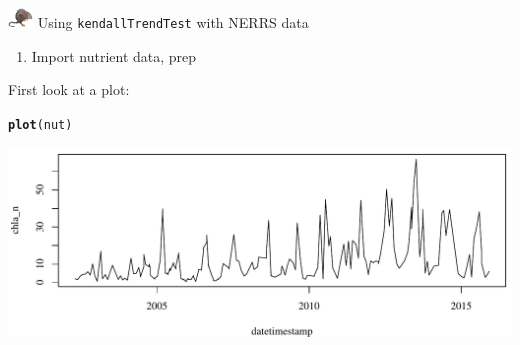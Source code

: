\documentclass[xcolor=dvipsnames,serif]{beamer}\usepackage[]{graphicx}\usepackage[]{color}
\makeatletter
\newcommand{\hlstd}[1]{\textcolor[rgb]{0.345,0.345,0.345}{#1}}%
\newcommand{\hlkwd}[1]{\textcolor[rgb]{0.737,0.353,0.396}{\textbf{#1}}}%
\newenvironment{kframe}{%
 \def\at@end@of@kframe{}%
 \ifinner\ifhmode%
  \def\at@end@of@kframe{\end{minipage}}%
  \begin{minipage}{\columnwidth}%
 \fi\fi%
 \def\FrameCommand##1{\hskip\@totalleftmargin \hskip-\fboxsep
 \colorbox{shadecolor}{##1}\hskip-\fboxsep
     \hskip-\linewidth \hskip-\@totalleftmargin \hskip\columnwidth}%
 \MakeFramed {\advance\hsize-\width
   \@totalleftmargin\z@ \linewidth\hsize
   \@setminipage}}%
 {\par\unskip\endMakeFramed%
 \at@end@of@kframe}
\newenvironment{knitrout}{}{} %
\makeatother
\begin{document}
\begin{frame}[fragile, t]{\includegraphics[width = 0.05\textwidth]{imgs/swmprat.png} Using \texttt{kendallTrendTest} with NERRS data}
\begin{enumerate}
\item<1-> Import nutrient data, prep
\end{enumerate}
First look at a plot:
\begin{knitrout}\scriptsize
{}\color{fgcolor}\begin{kframe}
\begin{alltt}
\hlkwd{plot}\hlstd{(nut)}
\end{alltt}
\end{kframe}

{\centering \includegraphics[width=\textwidth]{imgs/unnamed-chunk-7-1} 

}



\end{knitrout}
\end{frame}
\end{document}
